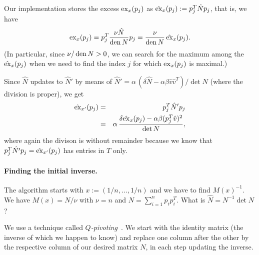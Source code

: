 \documentclass[a4paper,twocolumn]{article}
\newcommand{\den}{\ensuremath{\mathop{\rm den}\nolimits}}
\newcommand{\excess}{\ensuremath{\mathop{\rm ex}\nolimits}}
\begin{document}
Our implementation stores the excess $\excess_x(p_j)$ as
$\hat{\excess}_x(p_j):= p_j^T \hat{N} p_j$, that is, we have
\begin{equation}
  \excess_x(p_j) = p_j^T \frac{\nu \hat{N}}{\den{N}} p_j
               = \frac{\nu}{\den{N}}\,\hat{\excess}_x(p_j).
\end{equation}
(In particular, since $\nu/\den{N}>0$, we can search for the maximum
among the $\hat{\excess}_x(p_j)$ when we need to find the index $j$
for which $\excess_x(p_j)$ is maximal.)

Since $\hat{N}$ updates to $\hat{N}'$ by means of $\hat{N}' =
\alpha\,(\delta\hat{N}-\alpha\beta\hat{v}\hat{v}^T)/\det{N}$ (where
the division is proper), we get
\begin{eqnarray*}
  \hat{\excess}_{x'}(p_j) &=& p_j^T \hat{N}' p_j \\
       &=& \alpha\,\frac{\delta \hat{\excess}_x(p_j) -
                         \alpha\beta (p_j^T \hat{v})^2}%
                {\det{N}},
\end{eqnarray*}
where again the divison is without remainder because we know that
$p_j^T \hat{N'} p_j=\hat{\excess}_{x'}(p_j)$ has entries in $T$ only.

\paragraph{Finding the initial inverse.}
The algorithm starts with $x:=(1/n,\ldots,1/n)$ and we have to find
$M(x)^{-1}$.  We have $M(x) = N/\nu$ with $\nu=n$ and $N =
\sum_{i=1}^n p_ip_i^T$.  What is $\hat{N}=N^{-1} \det{N}$?

We use a technique called
\emph{$Q$-pivoting}~\cite{em-nsme-97,g-ealcc-98}.  We start with the
identity matrix (the inverse of which we happen to know) and replace
one column after the other by the respective column of our desired
matrix $N$, in each step updating the inverse.
\end{document}
